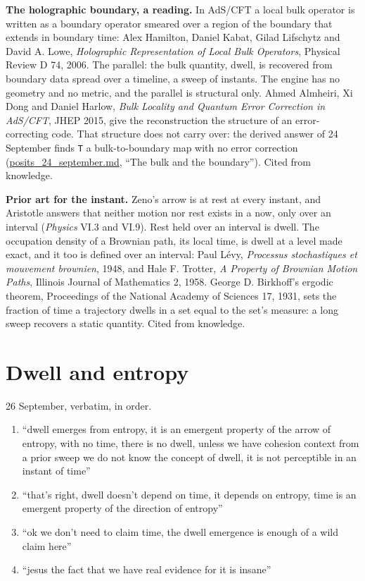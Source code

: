 \textbf{The holographic boundary, a reading.} In AdS/CFT a local bulk operator is written as a boundary operator smeared over a region of the boundary that extends in boundary time: Alex Hamilton, Daniel Kabat, Gilad Lifschytz and David A. Lowe, \emph{Holographic Representation of Local Bulk Operators}, Physical Review D 74, 2006. The parallel: the bulk quantity, dwell, is recovered from boundary data spread over a timeline, a sweep of instants. The engine has no geometry and no metric, and the parallel is structural only. Ahmed Almheiri, Xi Dong and Daniel Harlow, \emph{Bulk Locality and Quantum Error Correction in AdS/CFT}, JHEP 2015, give the reconstruction the structure of an error-correcting code. That structure does not carry over: the derived answer of 24 September finds \texttt{T} a bulk-to-boundary map with no error correction (\hyperref[chap:posits-24-september]{posits\_\allowbreak{}24\_\allowbreak{}september.md}, “The bulk and the boundary”). Cited from knowledge.

\textbf{Prior art for the instant.} Zeno's arrow is at rest at every instant, and Aristotle answers that neither motion nor rest exists in a now, only over an interval (\emph{Physics} VI.3 and VI.9). Rest held over an interval is dwell. The occupation density of a Brownian path, its local time, is dwell at a level made exact, and it too is defined over an interval: Paul Lévy, \emph{Processus stochastiques et mouvement brownien}, 1948, and Hale F. Trotter, \emph{A Property of Brownian Motion Paths}, Illinois Journal of Mathematics 2, 1958. George D. Birkhoff's ergodic theorem, Proceedings of the National Academy of Sciences 17, 1931, sets the fraction of time a trajectory dwells in a set equal to the set's measure: a long sweep recovers a static quantity. Cited from knowledge.

\section{\texorpdfstring{Dwell and entropy}{Dwell and entropy}}

26 September, verbatim, in order.

\begin{enumerate}
\item “dwell emerges from entropy, it is an emergent property of the arrow of entropy, with no time, there is no dwell, unless we have cohesion context from a prior sweep we do not know the concept of dwell, it is not perceptible in an instant of time”
\item “that's right, dwell doesn't depend on time, it depends on entropy, time is an emergent property of the direction of entropy”
\item “ok we don't need to claim time, the dwell emergence is enough of a wild claim here”
\item “jesus the fact that we have real evidence for it is insane”
\end{enumerate}

